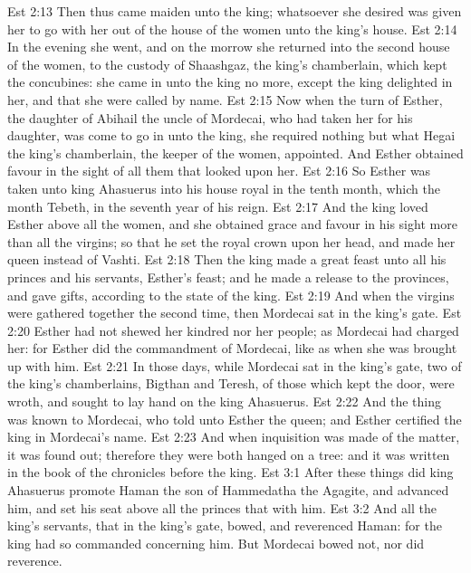 \vs Est 2:13 Then thus came  maiden unto the king; whatsoever she desired was given her to go with her out of the house of the women unto the king's house.
\vs Est 2:14 In the evening she went, and on the morrow she returned into the second house of the women, to the custody of Shaashgaz, the king's chamberlain, which kept the concubines: she came in unto the king no more, except the king delighted in her, and that she were called by name.
\vs Est 2:15 Now when the turn of Esther, the daughter of Abihail the uncle of Mordecai, who had taken her for his daughter, was come to go in unto the king, she required nothing but what Hegai the king's chamberlain, the keeper of the women, appointed. And Esther obtained favour in the sight of all them that looked upon her.
\vs Est 2:16 So Esther was taken unto king Ahasuerus into his house royal in the tenth month, which  the month Tebeth, in the seventh year of his reign.
\vs Est 2:17 And the king loved Esther above all the women, and she obtained grace and favour in his sight more than all the virgins; so that he set the royal crown upon her head, and made her queen instead of Vashti.
\vs Est 2:18 Then the king made a great feast unto all his princes and his servants,  Esther's feast; and he made a release to the provinces, and gave gifts, according to the state of the king.
\vs Est 2:19 And when the virgins were gathered together the second time, then Mordecai sat in the king's gate.
\vs Est 2:20 Esther had not  shewed her kindred nor her people; as Mordecai had charged her: for Esther did the commandment of Mordecai, like as when she was brought up with him.
\vs Est 2:21 In those days, while Mordecai sat in the king's gate, two of the king's chamberlains, Bigthan and Teresh, of those which kept the door, were wroth, and sought to lay hand on the king Ahasuerus.
\vs Est 2:22 And the thing was known to Mordecai, who told  unto Esther the queen; and Esther certified the king  in Mordecai's name.
\vs Est 2:23 And when inquisition was made of the matter, it was found out; therefore they were both hanged on a tree: and it was written in the book of the chronicles before the king.
\vs Est 3:1 After these things did king Ahasuerus promote Haman the son of Hammedatha the Agagite, and advanced him, and set his seat above all the princes that  with him.
\vs Est 3:2 And all the king's servants, that  in the king's gate, bowed, and reverenced Haman: for the king had so commanded concerning him. But Mordecai bowed not, nor did  reverence.
